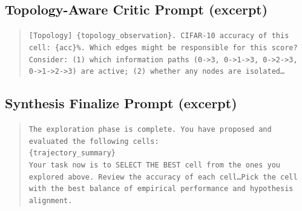 \subsection{Topology-Aware Critic Prompt (excerpt)}

\begin{quote}
\small
\texttt{[Topology] \{topology\_observation\}. CIFAR-10 accuracy of this cell:
\{acc\}\%. Which edges might be responsible for this score? Consider: (1) which
information paths (0->3, 0->1->3, 0->2->3, 0->1->2->3) are active; (2) whether
any nodes are isolated\ldots}
\end{quote}

\subsection{Synthesis Finalize Prompt (excerpt)}

\begin{quote}
\small
\texttt{The exploration phase is complete. You have proposed and evaluated the
following cells:}\\
\texttt{\{trajectory\_summary\}}\\[4pt]
\texttt{Your task now is to SELECT THE BEST cell from the ones you explored
above. Review the accuracy of each cell\ldots Pick the cell with the best
balance of empirical performance and hypothesis alignment.}
\end{quote}

